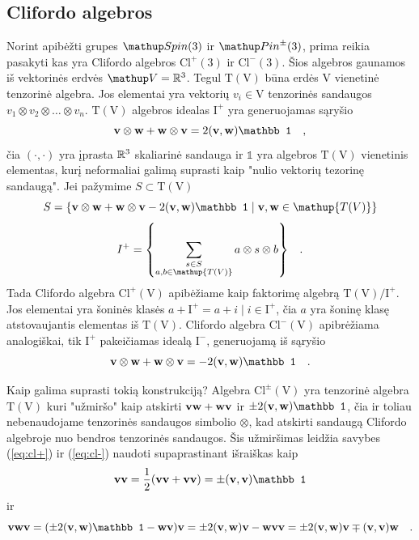 
\subsection{Clifordo algebros}

Norint apibėžti grupes $\spin$ ir $\pinpm$, prima reikia pasakyti kas yra Clifordo algebros
$\mathup{Cl}^+(3)$ ir $\mathup{Cl}^-(3)$. Šios algebros gaunamos iš vektorinės erdvės $\mathup V = \set{R}^3$.
Tegul $\mathup{T(V)}$ būna erdės $\mathup V$ vienetinė tenzorinė algebra. Jos elementai yra vektorių $v_i \in \mathup V$ tenzorinės
sandaugos $v_1 \otimes v_2 \otimes \dots \otimes v_n$. $\mathup{T(V)}$ algebros idealas $\mathup I^+$ yra generuojamas
sąryšio
\begin{equation}
	\vb v \otimes \vb w
	+
	\vb w \otimes \vb v
	=
	2(\vb v , \vb w) \mathbb 1
	\quad ,
	\label{eq:cl+}
\end{equation}
čia $(\cdot,\cdot)$ yra įprasta $\mathbb{R} ^3$ skaliarinė sandauga ir $\mathbb 1$ yra algebros $\mathup{T(V)}$
vienetinis elementas, kurį neformaliai galimą suprasti kaip "nulio vektorių tezorinę sandaugą".
Jei pažymime $S \subset \mathup{T(V)}$
\begin{equation}
	S = \qty{
		\vb v \otimes \vb w
		+
		\vb w \otimes \vb v
		-
		2(\vb v , \vb w) \mathbb 1
		\mid
		\vb v, \vb w \in \mathup{T(V)}
	}
\end{equation}
\begin{equation}
	I^+ = \qty{
		\sum_{\substack{
			s \in S \\ 
			a,b \in \mathup{T(V)} 
		}}
		a \otimes s \otimes b
	}
	\quad .
\end{equation}
Tada Clifordo algebra $\mathup{Cl^+(V)}$ apibėžiame kaip faktorimę algebrą $\mathup{T(V)/I^+}$.
Jos elementai yra šoninės klasės $a + \mathup I^+ = {a + i \mid i \in \mathup I^+}$, čia $a$
yra šoninę klasę atstovaujantis elementas iš $\mathup{T(V)}$. Clifordo algebra $\mathup{Cl^-(V)}$
apibrėžiama analogiškai, tik $\mathup I^+$ pakeičiamas idealą $\mathup I^-$, generuojamą iš sąryšio
\begin{equation}
	\vb v \otimes \vb w
	+
	\vb w \otimes \vb v
	=
	- 2(\vb v , \vb w) \mathbb 1
	\quad .
	\label{eq:cl-}
\end{equation}


Kaip galima suprasti tokią konstrukciją? Algebra $\mathup{Cl^\pm(V)}$ yra tenzorinė algebra $\mathup{T(V)}$
kuri "užmiršo" kaip atskirti $\vb v \vb w + \vb w \vb v$ ir $\pm2(\vb v, \vb w) \mathbb 1$,
čia ir toliau nebenaudojame tenzorinės sandaugos simbolio $\otimes$, kad atskirti sandaugą Clifordo algebroje
nuo bendros tenzorinės sandaugos.
Šis užmiršimas leidžia savybes (\ref{eq:cl+}) ir (\ref{eq:cl-}) naudoti supaprastinant išraiškas kaip
\begin{equation}
\vb v \vb v 
= \frac{1}{2}(\vb v \vb v + \vb v \vb v) 
= \pm(\vb v,\vb v) \mathbb 1
\end{equation}
ir
\begin{equation}
\vb v \vb w \vb v 
= \qty( \pm2(\vb v,\vb w)\mathbb 1 - \vb{wv} )\vb v 
= \pm2\vb{(v,w)} \vb v - \vb{wvv} 
=  \pm2\vb{(v,w)} \vb v \mp \vb{(v,v)}\vb w 
\quad .
\end{equation}

